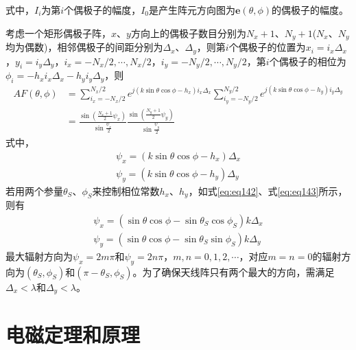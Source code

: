 \documentclass{article}
\numberwithin{equation}{section}
\renewcommand{\vec}[1]{\boldsymbol{#1}}
\begin{document}
式中，$I_i$为第$i$个偶极子的幅度，$I_0$是产生阵元方向图为$\vec{e}(\theta,\phi)$的偶极子的幅度。
\par
考虑一个矩形偶极子阵，$x$、$y$方向上的偶极子数目分别为$N_x+1$、$N_y+1$($N_x$、$N_y$均为偶数)，相邻偶极子的间距分别为$\Delta_x$、$\Delta_y$，则第$i$个偶极子的位置为$x_i=i_x\Delta_x$，$y_i=i_y\Delta_y$，$i_x=-N_x/2,\cdots,N_x/2$，$i_y=-N_y/2,\cdots,N_y/2$，第$i$个偶极子的相位为$\phi_i=-h_xi_x\Delta_x-h_yi_y\Delta_y$，则
\begin{align}
    \label{eq:eq153}
    AF(\theta,\phi)&=\sum_{i_x=-N_x/2}^{N_x/2}e^{j(k\sin\theta\cos\phi-h_x)i_x\Delta_x}\sum_{i_y=-N_y/2}^{N_y/2}e^{j(k\sin\theta\cos\phi-h_y)i_y\Delta_y} \nonumber \\
                   &=\frac{\sin\left(\frac{N_x+1}{2}\psi_x\right)}{\sin\frac{\psi_x}{2}}\frac{\sin\left(\frac{N_y+1}{2}\psi_y\right)}{\sin\frac{\psi_y}{2}}
\end{align}
式中，
\begin{align}
    \label{eq:eq154}
    \psi_x=(k\sin\theta\cos\phi-h_x)\Delta_x \\
    \label{eq:eq155}
    \psi_y=(k\sin\theta\cos\phi-h_y)\Delta_y
\end{align}
若用两个参量$\theta_{S}$、$\phi_{S}$来控制相位常数$h_x$、$h_y$，如式\ref{eq:eq142}、式\ref{eq:eq143}所示，则有
\begin{align}
    \label{eq:eq158}
    \psi_x=(\sin\theta\cos\phi-\sin\theta_{S}\cos\phi_{S})k\Delta_x \\
    \label{eq:eq159}
    \psi_y=(\sin\theta\cos\phi-\sin\theta_{S}\sin\phi_{S})k\Delta_y
\end{align}
最大辐射方向为$\psi_x=2m\pi$和$\psi_y=2n\pi$，$m,n=0,1,2,\cdots$，对应$m=n=0$的辐射方向为$(\theta_S,\phi_S)$和$(\pi-\theta_S,\phi_S)$。为了确保天线阵只有两个最大的方向，需满足$\Delta_x<\lambda$和$\Delta_y<\lambda$。
\section{电磁定理和原理}
\end{document}
